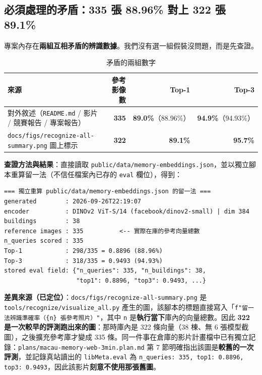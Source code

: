 \documentclass[11pt,a4paper,fontset=windows]{ctexart}
\newcommand{\key}[1]{\textbf{\color{ink}#1}}
\begin{document}
\subsection{必須處理的矛盾：335 張 88.96\% 對上 322 張 89.1\%}
\label{sec:conflict}

專案內存在\textbf{兩組互相矛盾的辨識數據}。我們沒有選一組假裝沒問題，而是先查證。

\begin{table}[H]
\centering
\small
\caption{矛盾的兩組數字}
\begin{tabular}{p{4.6cm}rrr}
\toprule
\textbf{來源} & \textbf{參考影像數} & \textbf{Top-1} & \textbf{Top-3} \\
\midrule
對外敘述（\texttt{README.md} / 影片 / 競賽報告 / 專案報告） & \textbf{335} & \textbf{89.0\%}（88.96\%） & \textbf{94.9\%}（94.93\%） \\
\texttt{docs/figs/recognize-all-summary.png} 圖上標示 & \textbf{322} & \textbf{89.1\%} & \textbf{95.7\%} \\
\bottomrule
\end{tabular}
\end{table}

\key{查證方法與結果}：直接讀取 \texttt{public/data/memory-embeddings.json}，並以獨立腳本重算留一法（不信任檔案內已存的 \texttt{eval} 欄位），得到：

\begin{verbatim}
=== 獨立重算 public/data/memory-embeddings.json 的留一法 ===
generated        : 2026-09-26T22:19:07
encoder          : DINOv2 ViT-S/14 (facebook/dinov2-small) | dim 384
buildings        : 38
reference images : 335          <-- 實際在庫的參考向量總數
n_queries scored : 335
Top-1            : 298/335 = 0.8896 (88.96%)
Top-3            : 318/335 = 0.9493 (94.93%)
stored eval field: {"n_queries": 335, "n_buildings": 38,
                    "top1": 0.8896, "top3": 0.9493, ...}
\end{verbatim}

\key{差異來源（已定位）}：\texttt{docs/figs/recognize-all-summary.png} 是 \texttt{tools/recognize/visualize\_all.py} 產生的圖，該腳本的標題直接寫入「\texttt{f"留一法辨識準確率（\{n\} 張參考照片）"}，其中 \texttt{n} 是\textbf{執行當下}庫內的向量總數。因此 \textbf{322 是一次較早的評測跑出來的圖}：那時庫內是 322 條向量（38 棟、無 6 張模型截圖），之後擴充參考庫才變成 335 條。同一件事在倉庫的影片計畫檔中已有獨立記錄：\texttt{plans/macau-memory-web-3min.plan.md} 第 7 節明確指出該圖是\textbf{較舊的一次評測}，並記錄真站讀出的 \texttt{libMeta.eval} 為 \texttt{n\_queries: 335, top1: 0.8896, top3: 0.9493}，因此該影片\textbf{刻意不使用那張舊圖}。
\end{document}
